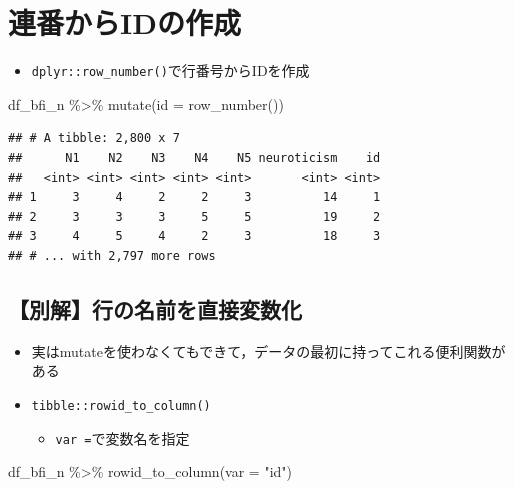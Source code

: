 \documentclass[
  xelatex,ja=standard, b5paper]{bxjsbook}
\newenvironment{Shaded}{\begin{snugshade}}{\end{snugshade}}
\newcommand{\AttributeTok}[1]{\textcolor[rgb]{0.77,0.63,0.00}{#1}}
\newcommand{\FunctionTok}[1]{\textcolor[rgb]{0.00,0.00,0.00}{#1}}
\newcommand{\NormalTok}[1]{#1}
\newcommand{\SpecialCharTok}[1]{\textcolor[rgb]{0.00,0.00,0.00}{#1}}
\newcommand{\StringTok}[1]{\textcolor[rgb]{0.31,0.60,0.02}{#1}}
\providecommand{\tightlist}{%
  \setlength{\itemsep}{0pt}\setlength{\parskip}{0pt}}
\begin{document}
\hypertarget{mu-seq}{%
\section{連番からIDの作成}\label{mu-seq}}

\begin{itemize}
\tightlist
\item
  \texttt{dplyr::row\_number()}で行番号からIDを作成
\end{itemize}

\begin{Shaded}
\begin{Highlighting}[]
\NormalTok{df\_bfi\_n }\SpecialCharTok{\%\textgreater{}\%} 
  \FunctionTok{mutate}\NormalTok{(}\AttributeTok{id =} \FunctionTok{row\_number}\NormalTok{())}
\end{Highlighting}
\end{Shaded}

\begin{verbatim}
## # A tibble: 2,800 x 7
##      N1    N2    N3    N4    N5 neuroticism    id
##   <int> <int> <int> <int> <int>       <int> <int>
## 1     3     4     2     2     3          14     1
## 2     3     3     3     5     5          19     2
## 3     4     5     4     2     3          18     3
## # ... with 2,797 more rows
\end{verbatim}

\hypertarget{mu-seq-other}{%
\subsection{【別解】行の名前を直接変数化}\label{mu-seq-other}}

\begin{itemize}
\tightlist
\item
  実はmutateを使わなくてもできて，データの最初に持ってこれる便利関数がある
\item
  \texttt{tibble::rowid\_to\_column()}

  \begin{itemize}
  \tightlist
  \item
    \texttt{var\ =}で変数名を指定
  \end{itemize}
\end{itemize}

\begin{Shaded}
\begin{Highlighting}[]
\NormalTok{df\_bfi\_n }\SpecialCharTok{\%\textgreater{}\%} 
  \FunctionTok{rowid\_to\_column}\NormalTok{(}\AttributeTok{var =} \StringTok{"id"}\NormalTok{)}
\end{Highlighting}
\end{Shaded}
\end{document}
